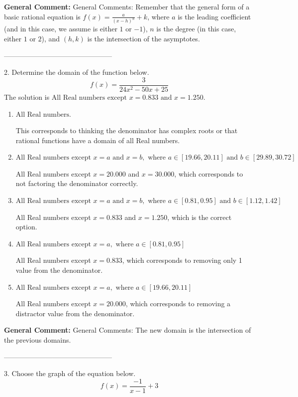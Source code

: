 \documentclass{extbook}[14pt]
\begin{document}
\textbf{General Comment:} General Comments: Remember that the general form of a basic rational equation is $ f(x) = \frac{a}{(x-h)^n} + k$, where $a$ is the leading coefficient (and in this case, we assume is either $1$ or $-1$), $n$ is the degree (in this case, either $1$ or $2$), and $(h, k)$ is the intersection of the asymptotes. 

-----------------------------------------------

2. Determine the domain of the function below.
\[ f(x) = \frac{3}{24x^{2} -50 x + 25} \] 
The solution is $ \text{All Real numbers except } x = 0.833 \text{ and } x = 1.250. $ 

\begin{enumerate}[label=\Alph*.] 
\item $ \text{All Real numbers.} $ 

 This corresponds to thinking the denominator has complex roots or that rational functions have a domain of all Real numbers. 
\item $ \text{All Real numbers except } x = a \text{ and } x = b, \text{ where } a \in [19.66, 20.11] \text{ and } b \in [29.89, 30.72] $ 

 All Real numbers except $x = 20.000$ and $x = 30.000$, which corresponds to not factoring the denominator correctly. 
\item $ \text{All Real numbers except } x = a \text{ and } x = b, \text{ where } a \in [0.81, 0.95] \text{ and } b \in [1.12, 1.42] $ 

 All Real numbers except $x = 0.833$ and $x = 1.250$, which is the correct option. 
\item $ \text{All Real numbers except } x = a, \text{ where } a \in [0.81, 0.95] $ 

 All Real numbers except $x = 0.833$, which corresponds to removing only 1 value from the denominator. 
\item $ \text{All Real numbers except } x = a, \text{ where } a \in [19.66, 20.11] $ 

 All Real numbers except $x = 20.000$, which corresponds to removing a distractor value from the denominator. 
\end{enumerate} 
 
\textbf{General Comment:} General Comments: The new domain is the intersection of the previous domains. 

-----------------------------------------------

3. Choose the graph of the equation below.
\[ f(x) = \frac{-1}{x - 1} + 3 \] 
\end{document}
